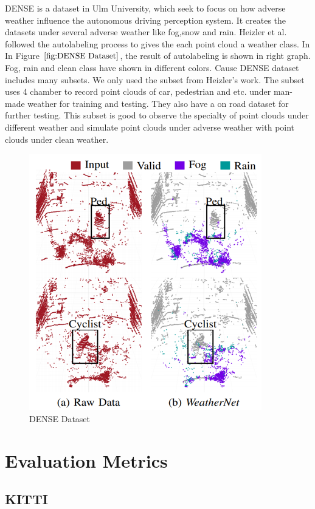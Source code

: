 DENSE is a dataset in Ulm University, which seek to focus on how adverse weather influence the autonomous driving perception system. It creates the datasets under several adverse weather like fog,snow and rain. Heizler et al.\cite{heinzler_cnn-based_2020} followed the autolabeling process to gives the each point cloud a weather class. In In Figure \(\ref{fig:DENSE Dataset}\), the result of autolabeling is shown in right graph. Fog, rain and clean class have shown in different colors. Cause DENSE dataset includes many subsets. We only used the subset from Heizler's work. The subset uses 4 chamber to record point clouds of car, pedestrian and etc. under man-made weather for training and testing. They also have a on road dataset for further testing. This subset is good to observe the specialty of point clouds under different weather and simulate point clouds under adverse weather with point clouds under clean weather.

\begin{figure}[!htbp]
\centering
\includegraphics[scale=0.5]{Graphics/DENSE.png}
\caption{DENSE Dataset}
\label{fig:DENSE Dataset}
\end{figure}
\section{Evaluation Metrics}
\label{evaluation Metrics}
\subsection{KITTI}
